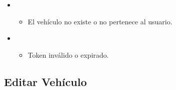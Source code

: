 \documentclass[letterpaper,10pt,spanish]{sphinxmanual}
\begin{document}
\begin{fulllineitems}
\begin{itemize}
\item {} 
\sphinxAtStartPar
{}
\begin{itemize}
\item {} 
\sphinxAtStartPar
El vehículo no existe o no pertenece al usuario.

\end{itemize}

\begin{sphinxVerbatim}[commandchars=\\\{\}]
\end{sphinxVerbatim}

\item {} 
\sphinxAtStartPar
{}
\begin{itemize}
\item {} 
\sphinxAtStartPar
Token inválido o expirado.

\end{itemize}

\end{itemize}

\end{fulllineitems}



\subsection{Editar Vehículo}
\label{\detokenize{endpoints:editar-vehiculo}}
\end{document}

